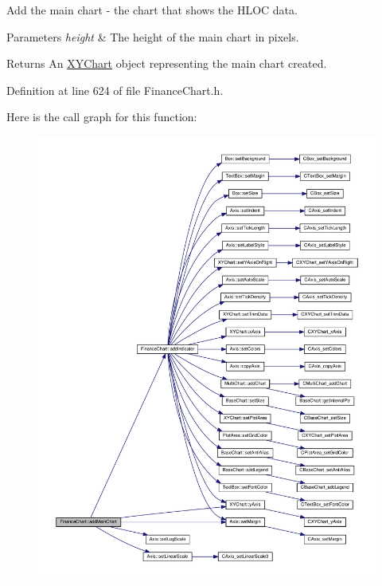 Add the main chart -\/ the chart that shows the H\+L\+OC data. 


\begin{DoxyParams}{Parameters}
{\em height} & The height of the main chart in pixels.\\
\hline
\end{DoxyParams}
\begin{DoxyReturn}{Returns}
An \hyperlink{class_x_y_chart}{X\+Y\+Chart} object representing the main chart created.
\end{DoxyReturn}


Definition at line 624 of file Finance\+Chart.\+h.

Here is the call graph for this function\+:
\nopagebreak
\begin{figure}[H]
\begin{center}
\leavevmode
\includegraphics[width=350pt]{class_finance_chart_a69ac5aca5d2d232184398b43fee6eb13_cgraph}
\end{center}
\end{figure}
\mbox{\label{class_finance_chart_a452f5d65f747033467a62eb280babfdc}} 
